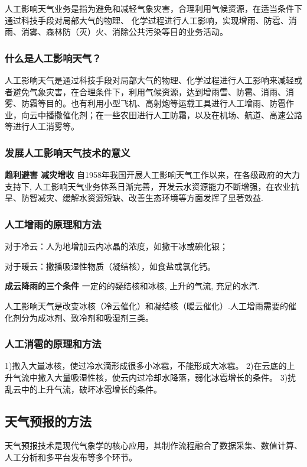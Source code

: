 \documentclass[12pt,a4paper]{article}
\begin{document}
	人工影响天气业务是指为避免和减轻气象灾害，合理利用气候资源，在适当条件下通过科技手段对局部大气的物理、
	化学过程进行人工影响，实现增雨、防雹、消雨、消雾、森林防（灭）火、消除公共污染等目的业务活动。
	
	\subsubsection{什么是人工影响天气？}
	
	人工影响天气是通过科技手段对局部大气的物理、化学过程进行人工影响来减轻或者避免气象灾害，在合理条件下，利用气候资源，达到增雨雪、防雹、消雨、消雾、防霜等目的。也有利用小型飞机、高射炮等运载工具进行人工增雨、防雹作业，向云中播撒催化剂；在一些农田进行人工防霜，以及在机场、航道、高速公路等进行人工消雾等。
	
	\subsubsection{发展人工影响天气技术的意义}
	
	\textbf{趋利避害 减灾增收}
	自1958年我国开展人工影响天气工作以来，在各级政府的大力支持下, 人工影响天气业务体系日渐完善，开发云水资源能力不断增强，在农业抗旱、防智减灾、缓解水资源短缺、改善生态环境等方面发挥了显著效益.
	
	\subsubsection{人工增雨的原理和方法}
	对于冷云：人为地增加云内冰晶的浓度，如撒干冰或碘化银；
	
	对于暖云：撒播吸湿性物质（凝结核），如食盐或氯化钙。
	
	\textbf{成云降雨的三个条件} 一定的的疑结核和冰核, 上升的气流, 充足的水汽.
	
	人工影响天气是改变冰核（冷云催化）和凝结核（暖云催化）.人工增雨需要的催化剂分为成冰剂、致冷剂和吸湿剂三类。
	
	\subsubsection{人工消雹的原理和方法}
	
	1)撒入大量冰核，使过冷水滴形成很多小冰雹，不能形成大冰雹。
	2)在云底的上升气流中撒入大量吸湿性核，使云内过冷却水降落，弱化冰雹增长的条件。
	3)扰乱云中的上升气流，破坏冰雹增长的条件。
	
	\subsection{天气预报的方法}
	天气预报技术是现代气象学的核心应用，其制作流程融合了数据采集、数值计算、人工分析和多平台发布等多个环节。
	
\end{document}
